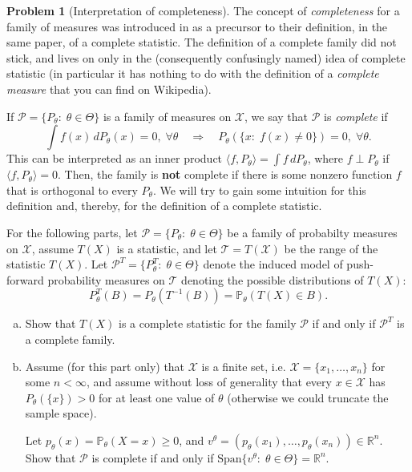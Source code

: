 \documentclass{article}
\newcommand{\cP}{\mathcal{P}}
\newcommand{\cX}{\mathcal{X}}
\newcommand{\cT}{\mathcal{T}}
\newcommand{\PP}{\mathbb{P}}
\newcommand{\RR}{\mathbb{R}}
\theoremstyle{definition}
\newtheorem{problem}{Problem}
\begin{document}
\begin{problem}[Interpretation of completeness]

The concept of {\em completeness} for a family of measures was introduced in \citet{lehmann1950completeness} as a precursor to their definition, in the same paper, of a complete statistic. The definition of a complete family did not stick, and lives on only in the (consequently confusingly named) idea of complete statistic (in particular it has nothing to do with the definition of a {\em complete measure} that you can find on Wikipedia).

If $\cP = \{P_\theta:\; \theta \in \Theta\}$ is a family of measures on $\cX$, we say that $\cP$ is {\em complete} if 
\[
\int f(x)\,d  P_\theta(x) = 0, \;\forall \theta \quad\Rightarrow\quad
P_\theta(\{x:\; f(x) \neq 0\}) = 0, \;\forall \theta.
\]
This can be interpreted as an inner product $\langle f, P_\theta\rangle = \int f\,d  P_\theta$, where $f \perp P_\theta$ if $\langle f, P_\theta\rangle = 0$. Then, the family is {\bf not} complete if there is some nonzero function $f$ that is orthogonal to every $P_\theta$. We will try to gain some intuition for this definition and, thereby, for the definition of a complete statistic.

For the following parts, let $\cP = \{P_\theta:\; \theta \in \Theta\}$ be a family of probabilty measures on $\cX$, assume $T(X)$ is a statistic, and let $\cT = T(\cX)$ be the range of the statistic $T(X)$. Let $\cP^T = \{P_\theta^T:\; \theta\in \Theta\}$ denote the induced model of push-forward probability measures on $\cT$ denoting the possible distributions of $T(X)$:
\[
P_\theta^T(B) = P_\theta(T^{-1}(B)) = \PP_\theta(T(X) \in B).
\]

\begin{enumerate}[(a)]
\item Show that $T(X)$ is a complete statistic for the family $\cP$ if and only if $\cP^T$ is a complete family.



\item Assume (for this part only) that $\cX$ is a finite set, i.e. $\cX = \{x_1,\ldots, x_n\}$ for some $n<\infty$, and assume without loss of generality that every $x\in\cX$ has $P_\theta(\{x\}) > 0$ for at least one value of $\theta$ (otherwise we could truncate the sample space). 

Let $p_\theta(x) = \PP_\theta(X = x) \geq 0$, and $v^\theta = (p_\theta(x_1),\ldots,p_\theta(x_n)) \in \RR^n$. Show that $\cP$ is complete if and only if $\text{Span}\{v^\theta:\;\theta\in\Theta\} = \RR^n$.




\end{enumerate}
\end{problem}
\end{document}

